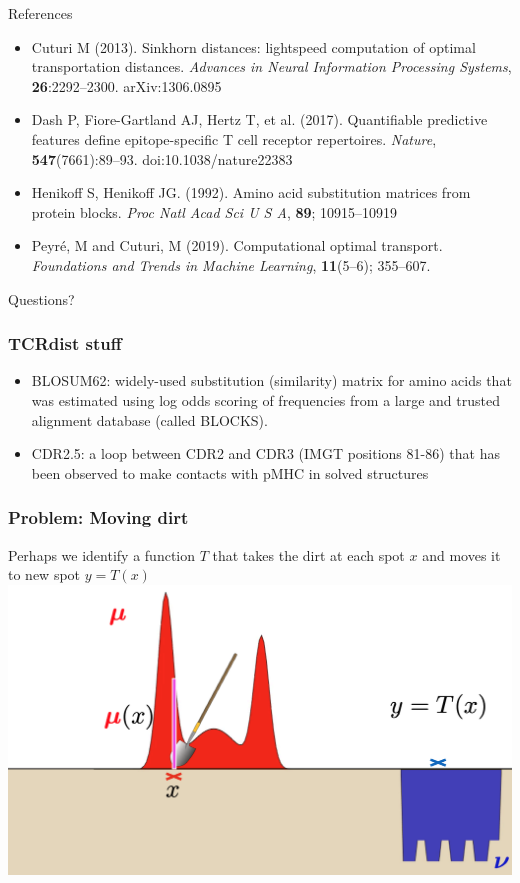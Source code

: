 \documentclass[mathserif,compress,xcolor={dvipsnames}]{beamer}
\renewcommand\;{\,}
\begin{document}
\begin{frame}{References}
\small
\begin{itemize}
\item[]
Cuturi M (2013). Sinkhorn distances: lightspeed computation of optimal transportation distances. {\em Advances in Neural Information Processing Systems}, \textbf{26}:2292--2300. arXiv:1306.0895
\bigskip
\item[]
Dash P, Fiore-Gartland AJ, Hertz T, et al. (2017). Quantifiable predictive features define epitope-specific T cell receptor repertoires. {\em Nature}, \textbf{547}(7661):89--93. doi:10.1038/nature22383
\bigskip
\item[]
Henikoff S, Henikoff JG. (1992). Amino acid substitution matrices from protein blocks. {\em Proc Natl Acad Sci U S A}, \textbf{89}; 10915--10919
\bigskip
\item[]
Peyr{\'e}, M and Cuturi, M (2019). Computational optimal transport. 
{\em Foundations and Trends in Machine Learning},
\textbf{11}(5--6); 355--607.
\end{itemize}
\end{frame}

\begin{frame}
\begin{center}
\Huge
Questions?
\end{center}
\end{frame}

\begin{frame}\frametitle{TCRdist stuff}
\begin{itemize}
\item
BLOSUM62: widely-used substitution (similarity) matrix for amino acids that was estimated using log odds scoring of frequencies from a large and trusted alignment database (called BLOCKS).
\bigskip
\item
CDR2.5: a loop between CDR2 and CDR3 (IMGT positions 81-86) that has been observed to make
contacts with pMHC in solved structures
\end{itemize}
\end{frame}



\begin{frame}\frametitle{Problem: Moving dirt}
Perhaps we identify a function $T$ that takes the dirt at each spot $x$ and moves it to new spot $y = T(x)$
\bigskip
\includegraphics[width=\linewidth]{Figures/EMD_shovel.png}
\end{frame}
\end{document}
